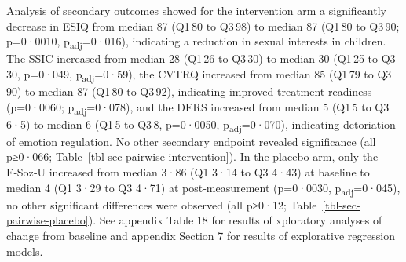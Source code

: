 \documentclass[
  super,
  preprint,
  1p,
  onecolumn]{elsarticle}
\begin{document}
\newpage{}

Analysis of secondary outcomes showed for the intervention arm a
significantly decrease in ESIQ from median 87 (Q1\,80 to Q3\,98) to
median 87 (Q1\,80 to Q3\,90; p=0·0010, p\textsubscript{adj}=0·016),
indicating a reduction in sexual interests in children. The SSIC
increased from median 28 (Q1\,26 to Q3\,30) to median 30 (Q1\,25 to
Q3\,30, p=0·049, p\textsubscript{adj}=0·59), the CVTRQ increased from
median 85 (Q1\,79 to Q3\,90) to median 87 (Q1\,80 to Q3\,92), indicating
improved treatment readiness (p=0·0060; p\textsubscript{adj}=0·078), and
the DERS increased from median 5 (Q1\,5 to Q3\,6·5) to median 6 (Q1\,5
to Q3\,8, p=0·0050, p\textsubscript{adj}=0·070), indicating detoriation
of emotion regulation. No other secondary endpoint revealed significance
(all p≥0·066; Table~\ref{tbl-sec-pairwise-intervention}). In the placebo
arm, only the F‑Soz‑U increased from median 3·86 (Q1 3·14 to Q3 4·43) at
baseline to median 4 (Q1 3·29 to Q3 4·71) at post‑measurement (p=0·0030,
p\textsubscript{adj}=0·045), no other significant differences were
observed (all p≥0·12; Table~\ref{tbl-sec-pairwise-placebo}). See
appendix Table 18 for results of xploratory analyses of change from
baseline and appendix Section 7 for results of explorative regression
models.

\newpage{}
\end{document}
